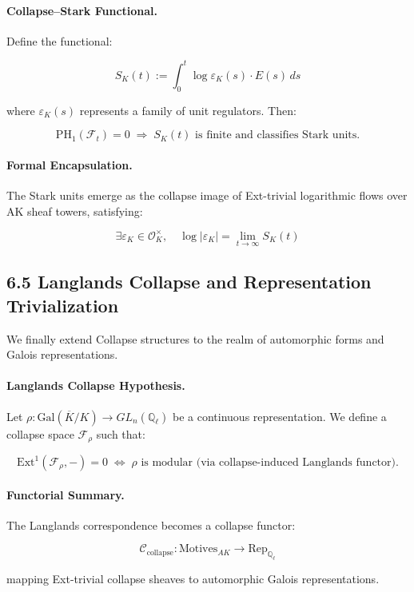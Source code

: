 \documentclass[11pt]{article}
\begin{document}
\paragraph{Collapse–Stark Functional.}
Define the functional:

\[
S_K(t) := \int_0^t \log \varepsilon_K(s) \cdot E(s)\, ds
\]

where \( \varepsilon_K(s) \) represents a family of unit regulators. Then:

\[
\mathrm{PH}_1(\mathcal{F}_t) = 0 \;\Rightarrow\; S_K(t) \text{ is finite and classifies Stark units.}
\]

\paragraph{Formal Encapsulation.}
The Stark units emerge as the collapse image of Ext-trivial logarithmic flows over AK sheaf towers, satisfying:

\[
\exists \varepsilon_K \in \mathcal{O}_K^\times, \quad \log |\varepsilon_K| = \lim_{t \to \infty} S_K(t)
\]

\subsection*{6.5 Langlands Collapse and Representation Trivialization}

We finally extend Collapse structures to the realm of automorphic forms and Galois representations.

\paragraph{Langlands Collapse Hypothesis.}
Let \( \rho: \text{Gal}(\overline{K}/K) \to GL_n(\mathbb{Q}_\ell) \) be a continuous representation.  
We define a collapse space \( \mathcal{F}_\rho \) such that:

\[
\mathrm{Ext}^1(\mathcal{F}_\rho, -) = 0 \;\Leftrightarrow\; \rho \text{ is modular (via collapse-induced Langlands functor)}.
\]

\paragraph{Functorial Summary.}
The Langlands correspondence becomes a collapse functor:

\[
\mathcal{C}_{\text{collapse}}: \text{Motives}_{AK} \longrightarrow \text{Rep}_{\mathbb{Q}_\ell}
\]

mapping Ext-trivial collapse sheaves to automorphic Galois representations.
\end{document}
